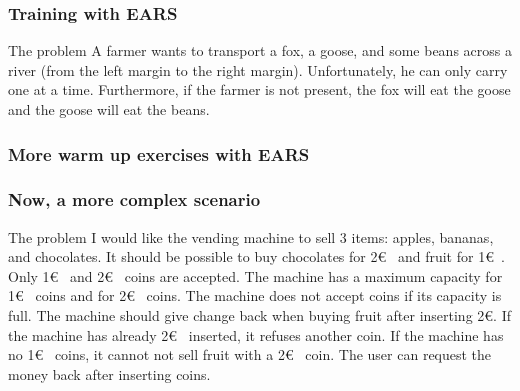 \documentclass[aspectratio=169]{beamer}
\begin{document}
\begin{frame}
  \frametitle{Training with EARS}
  \begin{block}{The problem}  
  A farmer wants to transport a fox, a goose, and some beans across a river (from the left margin to
the right margin). Unfortunately, he can only carry one at a time. Furthermore, if the farmer is not
present, the fox will eat the goose and the goose will eat the beans.  
  \end{block}
\end{frame}


\begin{frame}
  \frametitle{More warm up exercises with EARS}  
\end{frame}

\begin{frame}
  \frametitle{Now, a more complex scenario}
  \begin{block}{The problem}
    I would like the vending machine to sell 3 items: apples, bananas, and chocolates. It should
be possible to buy chocolates for 2\euro~ and fruit for 1\euro~. Only 1\euro~ and 2\euro~ coins are accepted. The machine has a maximum capacity for 1\euro~ coins and for 2\euro~ coins. The machine does
not accept coins if its capacity is full. The machine should give change back when buying
fruit after inserting 2\euro. If the machine has already 2\euro~ inserted, it refuses another coin. If
the machine has no 1\euro~ coins, it cannot not sell fruit with a 2\euro~ coin. The user can request
the money back after inserting coins.
  \end{block}
\end{frame}
\end{document}
